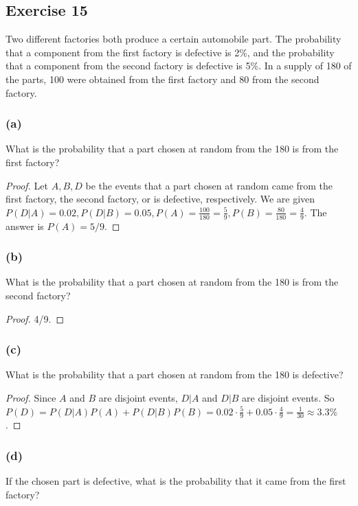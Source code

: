 \documentclass[14pt]{extarticle}
\begin{document}
\subsection{Exercise 15}
Two different factories both produce a certain automobile part. The probability that a component from the first factory
is defective is 2\%, and the probability that a component from the second factory is defective is 5\%. In a supply of 180 of
the parts, 100 were obtained from the first factory and 80 from the second factory.

\subsubsection{(a)}
What is the probability that a part chosen at random from the 180 is from the first factory?

\begin{proof}
     Let \(A,B,D\) be the events that a part chosen at random came from the first factory, the second factory, or is defective,
     respectively. We are given \(P(D|A) = 0.02, P(D|B) = 0.05, P(A) = \frac{100}{180} = \frac{5}{9}, P(B) = \frac{80}{180} =
     \frac{4}{9}\). The answer is \(P(A) = 5/9\).
\end{proof}

\subsubsection{(b)}
What is the probability that a part chosen at random from the 180 is from the second factory?

\begin{proof}
     4/9.
\end{proof}

\subsubsection{(c)}
What is the probability that a part chosen at random from the 180 is defective?

\begin{proof}
     Since \(A\) and \(B\) are disjoint events, \(D|A\) and \(D|B\) are disjoint events. So \(P(D) = P(D|A)P(A) + P(D|B)P(B) =
     0.02 \cdot \frac{5}{9} + 0.05 \cdot \frac{4}{9} = \frac{1}{30} \approx 3.3\%\).
\end{proof}

\subsubsection{(d)}
If the chosen part is defective, what is the probability that it came from the first factory?
\end{document}
